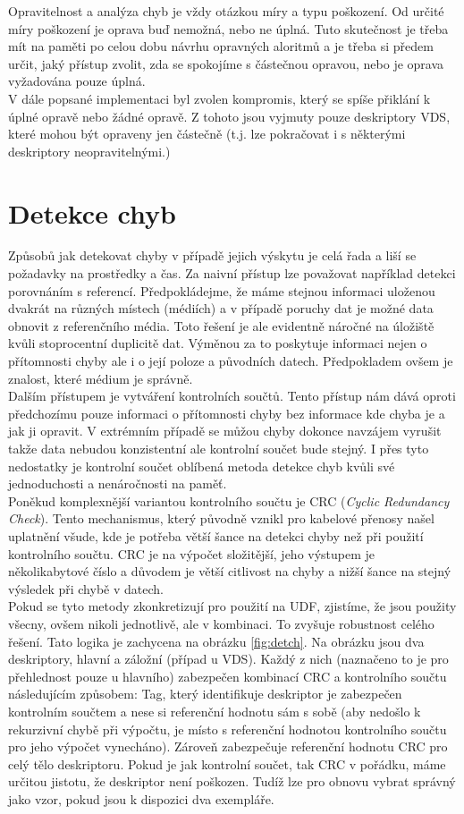 Opravitelnost a analýza chyb je vždy otázkou míry a typu poškození. Od určité míry poškození je oprava buď nemožná, nebo ne úplná. Tuto skutečnost je třeba mít na paměti po celou dobu návrhu opravných aloritmů a je třeba si předem určit, jaký přístup zvolit, zda se spokojíme s částečnou opravou, nebo je oprava vyžadována pouze úplná.\\
V dále popsané implementaci byl zvolen kompromis, který se spíše přiklání k úplné opravě nebo žádné opravě. Z tohoto jsou vyjmuty pouze deskriptory VDS, které mohou být opraveny jen částečně (t.j. lze pokračovat i s některými deskriptory neopravitelnými.)

\section{Detekce chyb}
\label{sec:errordetection}
Způsobů jak detekovat chyby v případě jejich výskytu je celá řada a liší se požadavky na prostředky a čas. Za naivní přístup lze považovat například detekci porovnáním s referencí. Předpokládejme, že máme stejnou informaci uloženou dvakrát na různých místech (médiích) a v případě poruchy dat je možné data obnovit z referenčního média. Toto řešení je ale evidentně náročné na úložiště kvůli stoprocentní duplicitě dat. Výměnou za to poskytuje informaci nejen o přítomnosti chyby ale i o její poloze a původních datech. Předpokladem ovšem je znalost, které médium je správně.\\ 
Dalším přístupem je vytváření kontrolních součtů. Tento přístup nám dává oproti předchozímu pouze informaci o přítomnosti chyby bez informace kde chyba je a jak ji opravit. V extrémním případě se můžou chyby dokonce navzájem vyrušit takže data nebudou konzistentní ale kontrolní součet bude stejný. I přes tyto nedostatky je kontrolní součet oblíbená metoda detekce chyb kvůli své jednoduchosti a nenáročnosti na paměť.\\
Poněkud komplexnější variantou kontrolního součtu je CRC (\textit{Cyclic Redundancy Check}). Tento mechanismus, který původně vznikl pro kabelové přenosy našel uplatnění všude, kde je potřeba větší šance na detekci chyby než při použití kontrolního součtu. CRC je na výpočet složitější, jeho výstupem je několikabytové číslo a důvodem je větší citlivost na chyby a nižší šance na stejný výsledek při chybě v datech.\\
Pokud se tyto metody zkonkretizují pro použití na UDF, zjistíme, že jsou použity všecny, ovšem nikoli jednotlivě, ale v kombinaci. To zvyšuje robustnost celého řešení. Tato logika je zachycena na obrázku \ref{fig:detch}. Na obrázku jsou dva deskriptory, hlavní a záložní (případ u VDS). Každý z nich (naznačeno to je pro přehlednost pouze u hlavního) zabezpečen kombinací CRC a kontrolního součtu následujícím způsobem: Tag, který identifikuje deskriptor je zabezpečen kontrolním součtem a nese si referenční hodnotu sám s sobě (aby nedošlo k rekurzivní chybě při výpočtu, je místo s referenční hodnotou kontrolního součtu pro jeho výpočet vynecháno). Zároveň zabezpečuje referenční hodnotu CRC pro celý tělo deskriptoru. Pokud je  jak kontrolní součet, tak CRC v pořádku, máme určitou jistotu, že deskriptor není poškozen. Tudíž lze pro obnovu vybrat správný jako vzor, pokud jsou k dispozici dva exempláře.\\
